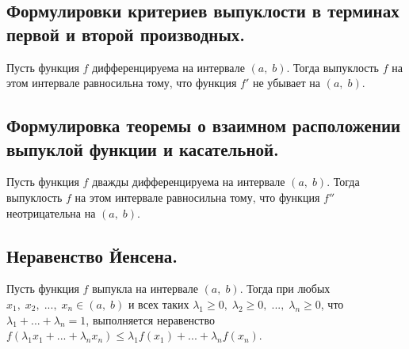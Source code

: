 

\label{sec_Definition19}
\begin{definition}
    \subsection*{Формулировки критериев выпуклости в терминах первой и второй производных.}
    \begin{note}[purple]
        Пусть функция $f$ дифференцируема на интервале $(a, \; b)$. Тогда выпуклость $f$ 
        на этом интервале равносильна тому, что функция $f'$ не убывает на $(a, \; b)$.
    \end{note}

    \subsection*{Формулировка теоремы о взаимном расположении выпуклой функции и касательной.}
    \begin{note}[purple]
        Пусть функция $f$ дважды дифференцируема на интервале $(a, \; b)$. Тогда выпуклость $f$
        на этом интервале равносильна тому, что функция $f''$  неотрицательна на $(a, \; b)$. 
    \end{note}

    \subsection*{Неравенство Йенсена.}
    \begin{note}[purple]
        Пусть функция $f$ выпукла на интервале $(a, \; b)$. Тогда при любых 
        $x_1, \; x_2, \; ..., \; x_n \in (a, \; b)$ и всех таких 
        $\lambda_1 \geq 0, \; \lambda_2 \geq 0, \; ..., \; \lambda_n \geq 0$, что
        $\lambda_1 + ... + \lambda_n = 1$, выполняется неравенство
        $f(\lambda_1 x_1 + ... + \lambda_n x_n) \leq \lambda_1 f(x_1) + ... + \lambda_n f(x_n)$.
    \end{note}
\end{definition}